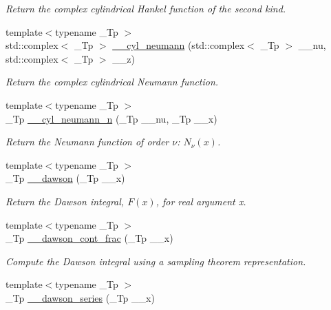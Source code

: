 \begin{DoxyCompactItemize}
\begin{DoxyCompactList}\small\item\em Return the complex cylindrical Hankel function of the second kind. \end{DoxyCompactList}\item 
{\footnotesize template$<$typename \+\_\+\+Tp $>$ }\\std\+::complex$<$ \+\_\+\+Tp $>$ \hyperlink{namespacestd_1_1____detail_ac73a4e3b8ac311760c998277aadb0fcb}{\+\_\+\+\_\+cyl\+\_\+neumann} (std\+::complex$<$ \+\_\+\+Tp $>$ \+\_\+\+\_\+nu, std\+::complex$<$ \+\_\+\+Tp $>$ \+\_\+\+\_\+z)
\begin{DoxyCompactList}\small\item\em Return the complex cylindrical Neumann function. \end{DoxyCompactList}\item 
{\footnotesize template$<$typename \+\_\+\+Tp $>$ }\\\+\_\+\+Tp \hyperlink{namespacestd_1_1____detail_ae414a6b5c064dc2b9b9a3b28e6cec813}{\+\_\+\+\_\+cyl\+\_\+neumann\+\_\+n} (\+\_\+\+Tp \+\_\+\+\_\+nu, \+\_\+\+Tp \+\_\+\+\_\+x)
\begin{DoxyCompactList}\small\item\em Return the Neumann function of order $ \nu $\+: $ N_{\nu}(x) $. \end{DoxyCompactList}\item 
{\footnotesize template$<$typename \+\_\+\+Tp $>$ }\\\+\_\+\+Tp \hyperlink{namespacestd_1_1____detail_a6384fb4c5af31b41a38c120869a548c7}{\+\_\+\+\_\+dawson} (\+\_\+\+Tp \+\_\+\+\_\+x)
\begin{DoxyCompactList}\small\item\em Return the Dawson integral, $ F(x) $, for real argument {\ttfamily x}. \end{DoxyCompactList}\item 
{\footnotesize template$<$typename \+\_\+\+Tp $>$ }\\\+\_\+\+Tp \hyperlink{namespacestd_1_1____detail_a3ad3b7b4dcebdf69778dbf7a5ba2427c}{\+\_\+\+\_\+dawson\+\_\+cont\+\_\+frac} (\+\_\+\+Tp \+\_\+\+\_\+x)
\begin{DoxyCompactList}\small\item\em Compute the Dawson integral using a sampling theorem representation. \end{DoxyCompactList}\item 
{\footnotesize template$<$typename \+\_\+\+Tp $>$ }\\\+\_\+\+Tp \hyperlink{namespacestd_1_1____detail_a033d91cc1c67280385ff3d1d809a21d1}{\+\_\+\+\_\+dawson\+\_\+series} (\+\_\+\+Tp \+\_\+\+\_\+x)

\end{DoxyCompactItemize}
